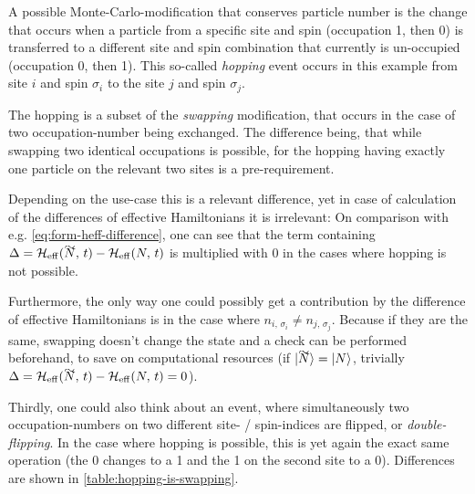 A possible Monte-Carlo-modification that conserves particle number is the change that occurs when a particle from a specific site and spin (occupation 1, then 0) is transferred to a different site and spin combination that currently is un-occupied (occupation 0, then 1).
This so-called \emph{hopping} event occurs in this example from site $i$ and spin $\sigma_i$ to the site $j$ and spin $\sigma_j$. 

The hopping is a subset of the \emph{swapping} modification, that occurs in the case of two occupation-number being exchanged.
The difference being, that while swapping two identical occupations is possible, for the hopping having exactly one particle on the relevant two sites is a pre-requirement.

Depending on the use-case this is a relevant difference, yet in case of calculation of the differences of effective Hamiltonians it is irrelevant: 
On comparison with e.g. \autoref{eq:form-heff-difference}, one can see that the term containing $\Delta = \HeffOft[\vphantom{N}\smash{\tilde{N}}]-\HeffOft[N]$ is multiplied with 0 in the cases where hopping is not possible.

Furthermore, the only way one could possibly get a contribution by the difference of effective Hamiltonians is in the case where $n_{i,\,\sigma_i} \neq n_{j,\,\sigma_j}$.
Because if they are the same, swapping doesn't change the state and a check can be performed beforehand, to save on computational resources (if $\ketN[\vphantom{N}\smash{\tilde{N}}] = \ketN[N]$, trivially  $\Delta = \HeffOft[\vphantom{N}\smash{\tilde{N}}]-\HeffOft[N] = 0$).

Thirdly, one could also think about an event, where simultaneously two occupation-numbers on two different site- / spin-indices are flipped, or \emph{double-flipping}.
In the case where hopping is possible, this is yet again the exact same operation (the 0 changes to a 1 and the 1 on the second site to a 0).
Differences are shown in \autoref{table:hopping-is-swapping}.

